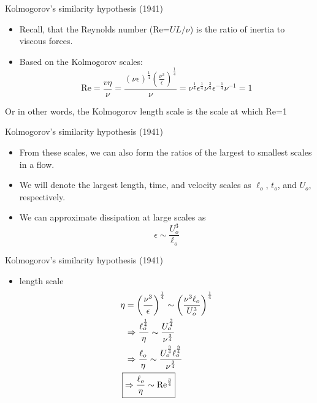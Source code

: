 
\begin{frame}{Kolmogorov's similarity hypothesis (1941)}
\begin{itemize}
	\item Recall, that the Reynolds number (Re=$UL/\nu$) is the ratio of inertia to viscous forces.
	\item Based on the Kolmogorov scales: $$\text{Re} = \frac{v \eta}{\nu} = \frac{ (\nu \epsilon)^{\frac{1}{4}} \left(\frac{\nu^3}{\epsilon}\right)^{\frac{1}{4}}}{\nu} = \nu^{\frac{1}{4}} \epsilon^{\frac{1}{4}} \nu^{\frac{3}{4} }\epsilon^{-\frac{1}{4}} \nu^{-1} = 1$$
\end{itemize}
Or in other words, the Kolmogorov length scale is the scale at which Re=1
\end{frame}


\begin{frame}{Kolmogorov's similarity hypothesis (1941)}
\begin{itemize}
	\item From these scales, we can also form the ratios of the largest to smallest scales in a flow. 
	\item We will denote the largest length, time, and velocity scales as $\ell_o$, $t_o$, and $U_o$, respectively.
	\item We can approximate dissipation at large scales as $$\epsilon \sim \frac{U_o^3}{\ell_o}$$
\end{itemize}
\end{frame}


\begin{frame}{Kolmogorov's similarity hypothesis (1941)}
\begin{itemize}
	\item length scale
	\begin{align*} 
		\eta &= \left(\frac{\nu^3}{\epsilon}\right)^{\frac{1}{4}} \sim \left(\frac{\nu^3 \ell_o}{U_o^3}\right)^{\frac{1}{4}}\\ 
		&\Rightarrow \frac{\ell_o^{\frac{1}{4}}}{\eta} \sim \frac{U_o^{\frac{3}{4}}}{\nu^{\frac{3}{4}}}\\
		&\Rightarrow \frac{\ell_o}{\eta} \sim \frac{U_o^{\frac{3}{4}}\ell_o^{\frac{3}{4}}}{\nu^{\frac{3}{4}}} \\
		\Aboxed{&\Rightarrow \frac{\ell_o}{\eta} \sim \text{Re}^{\frac{3}{4}}}
	\end{align*}
\end{itemize}
\end{frame}

